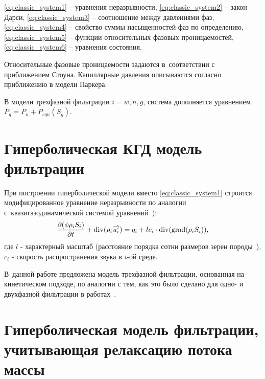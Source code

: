 \eqref{eq:classic_system1} -- уравнения неразрывности,
\eqref{eq:classic_system2} -- закон Дарси,
\eqref{eq:classic_system3} -- соотношение между давлениями фаз,
\eqref{eq:classic_system4} -- свойство суммы насыщенностей фаз по определению,
\eqref{eq:classic_system5} -- функции относительных фазовых проницаемостей,
\eqref{eq:classic_system6} -- уравнения состояния.

Относительные фазовые проницаемости задаются в~соответствии с~
приближением Стоуна\cite{Aziz-Settari}.
Капиллярные давления описываются согласно приближению в модели Паркера\cite{Parker}.

В модели трехфазной фильтрации $i = w,n,g$, система дополняется уравнением $P_g = P_n + P_{cgn}({S}_g)$.

\section{Гиперболическая КГД модель фильтрации} \label{sec:ch1/sec2}

При построении гиперболической модели вместо \eqref{eq:classic_system1} строится модифицированное уравнение неразрывности по аналогии с~квазигазодинамической системой уравнений~\cite{Chetverushkin-Mathmod}):
\begin{equation}
 \label{mass_mod}
  \frac{\partial (\phi \rho_i S_i)}{\partial t}+ \mathop{\mathrm{div}}\nolimits(\rho_i \overrightarrow{u_i}) = q_i + l c_i \cdot \mathop{\mathrm{div}}\nolimits(\mathop{\mathrm{grad}}\nolimits(\rho_i S_i)),
\end{equation}
где $l$ - характерный масштаб (расстояние порядка сотни размеров зерен породы~\cite{Chetverushkin}),
$c_i$ - скорость распространения звука в $i$-ой среде.

В~данной работе предложена модель трехфазной фильтрации, основанная на кинетическом подходе, по аналогии с тем, как это было сделано для одно- и двухфазной фильтрации в работах~\cite{Mathmod-2010,Mathmod-2011}.

\section{Гиперболическая модель фильтрации, учитывающая релаксацию потока массы} \label{sec:ch1/sec3}

